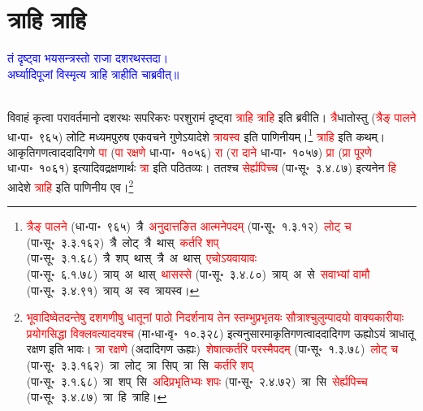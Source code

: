 \section[त्राहि त्राहि]{त्राहि त्राहि}
\centering\textcolor{blue}{तं दृष्ट्वा भयसन्त्रस्तो राजा दशरथस्तदा।\nopagebreak\\
अर्घ्यादिपूजां विस्मृत्य त्राहि त्राहीति चाब्रवीत्॥}\nopagebreak\\
\\
\fontsize{14}{21}\selectfont\begin{sloppypar}\justifying\noindent\hspace{10mm} विवाहं
कृत्वा 
परावर्तमानो दशरथः सपरिकरः परशुरामं दृष्ट्वा \textcolor{red}{त्राहि त्राहि} इति ब्रवीति। \textcolor{red}{त्रै}\-धातोस्तु (\textcolor{red}{त्रैङ् पालने} धा॰पा॰~९६५) लोटि मध्यम\-पुरुष एक\-वचने गुणेऽयादेशे \textcolor{red}{त्रायस्व} इति पाणिनीयम्।\footnote{\textcolor{red}{त्रैङ् पालने} (धा॰पा॰~९६५)~\arrow त्रै~\arrow \textcolor{red}{अनुदात्तङित आत्मने\-पदम्} (पा॰सू॰~१.३.१२)~\arrow \textcolor{red}{लोट् च} (पा॰सू॰~३.३.१६२)~\arrow त्रै~लोट्~\arrow त्रै~थास्~\arrow \textcolor{red}{कर्तरि शप्} (पा॰सू॰~३.१.६८)~\arrow त्रै~शप्~थास्~\arrow त्रै~अ~थास्~\arrow \textcolor{red}{एचोऽयवायावः} (पा॰सू॰~६.१.७८)~\arrow त्राय्~अ~थास्~\arrow \textcolor{red}{थासस्से} (पा॰सू॰~३.४.८०)~\arrow त्राय्~अ~से~\arrow \textcolor{red}{सवाभ्यां वामौ} (पा॰सू॰~३.४.९१)~\arrow त्राय्~अ~स्व~\arrow त्रायस्व।} \textcolor{red}{त्राहि} इति कथम्। आकृति\-गणत्वाददादि\-गणे \textcolor{red}{पा} (\textcolor{red}{पा रक्षणे} धा॰पा॰~१०५६) \textcolor{red}{रा} (\textcolor{red}{रा दाने} धा॰पा॰~१०५७) \textcolor{red}{प्रा} (\textcolor{red}{प्रा पूरणे} धा॰पा॰~१०६१) इत्यादिवद्रक्षणार्थः \textcolor{red}{त्रा} इति पठितव्यः। ततश्च \textcolor{red}{सेर्ह्यपिच्च} (पा॰सू॰~३.४.८७) इत्यनेन \textcolor{red}{हि} आदेशे \textcolor{red}{त्राहि} इति पाणिनीय एव।\footnote{\textcolor{red}{भूवादिष्वेतदन्तेषु दशगणीषु धातूनां पाठो निदर्शनाय तेन स्तम्भुप्रभृतयः सौत्राश्चुलुम्पादयो वाक्यकारीयाः प्रयोगसिद्धा विक्लवत्यादयश्च} (मा॰धा॰वृ॰~१०.३२८) इत्यनुसारमाकृति\-गणत्वाददादि\-गण ऊह्योऽयं त्राधातू रक्षण इति भावः। \textcolor{red}{त्रा रक्षणे} (अदादिगण ऊह्यः)~\arrow \textcolor{red}{शेषात्कर्तरि परस्मैपदम्} (पा॰सू॰~१.३.७८)~\arrow \textcolor{red}{लोट् च} (पा॰सू॰~३.३.१६२)~\arrow त्रा~लोट्~\arrow त्रा~सिप्~\arrow त्रा~सि~\arrow \textcolor{red}{कर्तरि शप्} (पा॰सू॰~३.१.६८)~\arrow त्रा~शप्~सि~\arrow \textcolor{red}{अदिप्रभृतिभ्यः शपः} (पा॰सू॰~२.४.७२)~\arrow त्रा~सि~\arrow \textcolor{red}{सेर्ह्यपिच्च} (पा॰सू॰~३.४.८७)~\arrow त्रा~हि~\arrow त्राहि।}\end{sloppypar}
